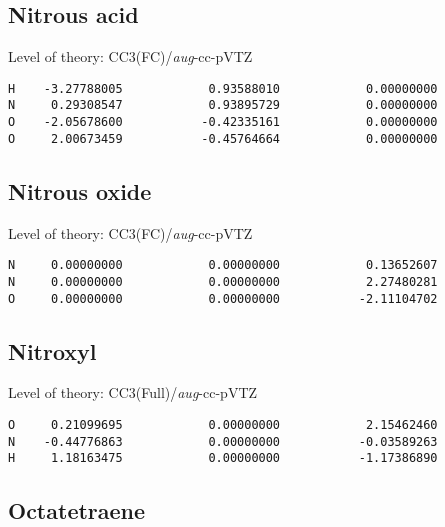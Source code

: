 \documentclass[journal=jctcce,manuscript=article,layout=traditional]{achemso}
\newcommand{\AVTZ}{\emph{aug}-cc-pVTZ}
\begin{document}
\subsection*{Nitrous acid}

\begin{singlespace}
Level of theory: CC3(FC)/{\AVTZ}
\begin{verbatim}
H    -3.27788005            0.93588010            0.00000000
N     0.29308547            0.93895729            0.00000000
O    -2.05678600           -0.42335161            0.00000000
O     2.00673459           -0.45764664            0.00000000
\end{verbatim}
\end{singlespace}

\subsection*{Nitrous oxide}

\begin{singlespace}
Level of theory: CC3(FC)/{\AVTZ}
\begin{verbatim}
N     0.00000000            0.00000000            0.13652607
N     0.00000000            0.00000000            2.27480281
O     0.00000000            0.00000000           -2.11104702
\end{verbatim}
\end{singlespace}

\subsection*{Nitroxyl}

\begin{singlespace}
Level of theory: CC3(Full)/{\AVTZ}
\begin{verbatim}
O     0.21099695            0.00000000            2.15462460
N    -0.44776863            0.00000000           -0.03589263
H     1.18163475            0.00000000           -1.17386890
\end{verbatim}
\end{singlespace}

\subsection*{Octatetraene}
\end{document}
